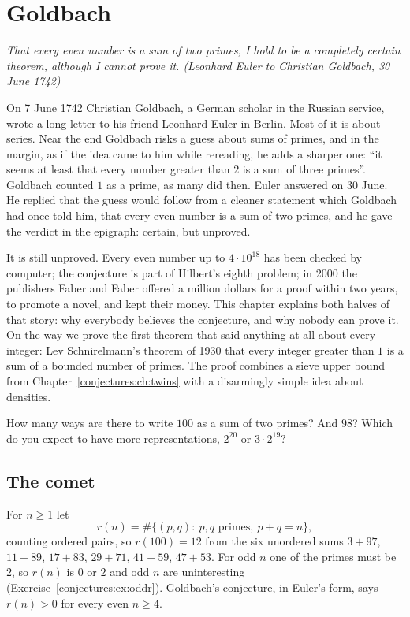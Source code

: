 \chapter{Goldbach}\label{conjectures:ch:goldbach}

\begin{center}\itshape
That every even number is a sum of two primes, I hold to be a completely certain theorem, although I cannot prove it.
\upshape(Leonhard Euler to Christian Goldbach, 30 June 1742)
\end{center}

On 7 June 1742 Christian Goldbach, a German scholar in the Russian service, wrote a long letter to his friend Leonhard Euler in Berlin. Most of
it is about series. Near the end Goldbach risks a guess about sums of primes, and in the margin, as if the idea came to him while rereading, he adds a
sharper one: ``it seems at least that every number greater than $2$ is a sum of three primes''. Goldbach counted $1$ as a prime, as many did then. Euler
answered on 30 June. He replied that the guess would follow from a cleaner statement which Goldbach had once told him, that every even number is a sum of
two primes, and he gave the verdict in the epigraph: certain, but unproved.

It is still unproved. Every even number up to $4\cdot10^{18}$ has been checked by computer; the conjecture is part of Hilbert's eighth problem; in 2000
the publishers Faber and Faber offered a million dollars for a proof within two years, to promote a novel, and kept their money. This chapter explains
both halves of that story: why everybody believes the conjecture, and why nobody can prove it. On the way we prove the first theorem that said
anything at all about every integer: Lev Schnirelmann's theorem of 1930 that every integer greater than $1$ is a sum of a bounded number of primes.
The proof combines a sieve upper bound from Chapter~\ref{conjectures:ch:twins} with a disarmingly simple idea about densities.

\begin{think}
How many ways are there to write $100$ as a sum of two primes? And $98$? Which do you expect to have more representations, $2^{20}$ or $3\cdot2^{19}$?
\end{think}

\section{The comet}

For $n\ge1$ let
\[
r(n)=\#\{(p,q):\ p,q\text{ primes},\ p+q=n\},
\]
counting ordered pairs, so $r(100)=12$ from the six unordered sums $3+97$, $11+89$, $17+83$, $29+71$, $41+59$, $47+53$. For odd $n$ one of the primes
must be $2$, so $r(n)$ is $0$ or $2$ and odd $n$ are uninteresting (Exercise~\ref{conjectures:ex:oddr}). Goldbach's conjecture, in Euler's form, says
$r(n)>0$ for every even $n\ge4$.

